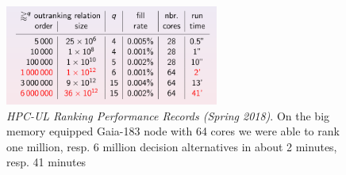\begin{figure}[ht]
\sidecaption[t]
\includegraphics[width=7cm]{Figures/11-2-rankingRecords.png}
\caption[HPC-UL Ranking Performance Records (Spring 2018)]{\emph{HPC-UL Ranking Performance Records (Spring 2018)}. On the big memory equipped Gaia-183 node with 64 cores we were able to rank one million, resp. 6 million decision alternatives in about 2 minutes, resp. 41 minutes}
\label{fig:11.2}       %
\end{figure}
  
%


